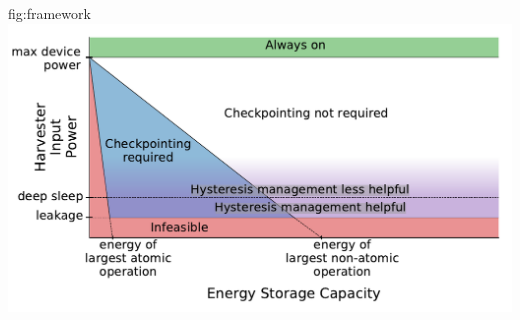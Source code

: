 \begin{definefigure}{fig:framework}
  \centering
  \includegraphics[width=\columnwidth]{figs/capacity/harvesting_framework/framework}
  \caption{
  \normalfont Design space for energy-harvesting sensors based on their energy
  income (which we assume is constant for this analysis), energy storage capacity, and workload.
  Workload is represented by the largest atomic/non-atomic operations supported
  by a design, as well as the deep sleep and leakage power.  The plot breaks
  into four regions: \textbf{1)} always
  on or effectively powered, \textbf{2)} Infeasible due to lack of energy storage or
  leakage higher than harvesting rate \textbf{3)} Feasible but requires checkpointing
  to make forward progress, and \textbf{4)} Enough energy storage to not require
  or benefit from checkpointing. Additionally, sensors which have high
  power when they enter deep sleep before depleting their
  energy buffer may benefit from hysteresis management techniques.
  This benefit diminishes with lower sleep currents and higher harvesting potential.
  }
\end{definefigure}


